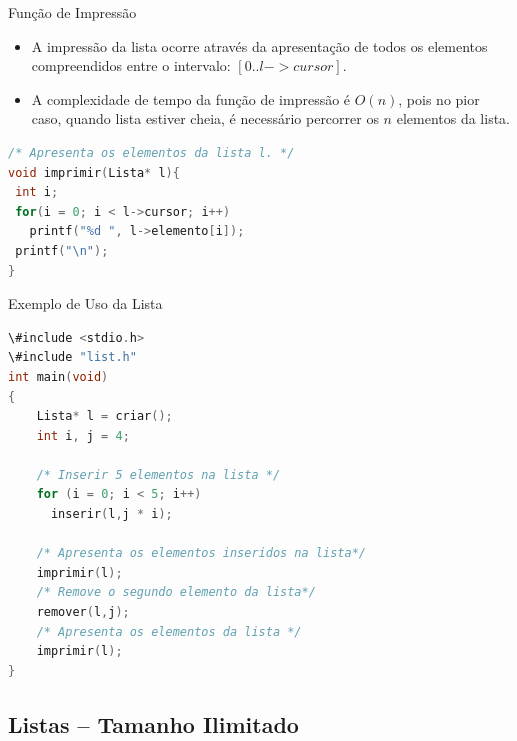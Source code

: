 \begin{frame}[fragile]{Função de Impressão}

\begin{itemize}

\item A impressão da lista ocorre através da apresentação de todos os elementos compreendidos entre o intervalo: 
  $[0 .. l->cursor]$.

\item A complexidade de tempo da função de impressão é $O(n)$, pois no 
  pior caso, quando lista estiver cheia, é necessário percorrer 
  os $n$ elementos da lista.
\end{itemize}
	
\begin{lstlisting}[language=C]
/* Apresenta os elementos da lista l. */
void imprimir(Lista* l){
 int i;
 for(i = 0; i < l->cursor; i++)
   printf("%d ", l->elemento[i]);
 printf("\n");  
}
\end{lstlisting}	
\end{frame}

\begin{frame}[fragile,c]{Exemplo de Uso da Lista}

\begin{lstlisting}[language=C]
\#include <stdio.h>
\#include "list.h"
int main(void)
{
    Lista* l = criar();
    int i, j = 4;
    
    /* Inserir 5 elementos na lista */
    for (i = 0; i < 5; i++)
      inserir(l,j * i);
    
    /* Apresenta os elementos inseridos na lista*/    
    imprimir(l);
    /* Remove o segundo elemento da lista*/
    remover(l,j);
    /* Apresenta os elementos da lista */    
    imprimir(l);        
}
\end{lstlisting}

\end{frame} 


\subsection{Listas -- Tamanho Ilimitado}


